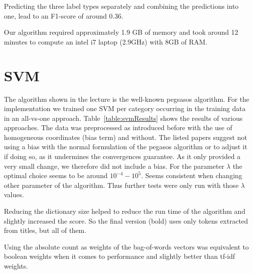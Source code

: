 \documentclass{article}
\begin{document}
    Predicting the three label types separately and combining the predictions into one, lead to an F1-score of around 0.36.

    Our algorithm required approximately 1.9 GB of memory and took around 12 minutes to compute an intel i7 laptop (2.9GHz) with 8GB of RAM.

\section*{SVM}
The algorithm shown in the lecture is the well-known pegsasos algorithm\cite{shalev-shwartz_pegasos:_2011,shalev-shwartz_pegasos:_????}. For the implementation we trained one SVM per category occurring in the training data in an all-vs-one approach.
Table~\ref{table:svmResults} shows the results of various approaches.
The data was preprocessed as introduced before with the use of homogeneous coordinates (bias term) and without. The listed papers suggest not using a bias with the normal formulation of the pegasos algorithm or to adjust it if doing so, as it undermines the convergences guarantee. As it only provided a very small change, we therefore did not include a bias. For the parameter $\lambda$ the optimal choice seems to be around $10^{-4} - 10^{5}$. Seems consistent when changing other parameter of the algorithm. Thus further tests were only run with those $\lambda$ values.

Reducing the dictionary size helped to reduce the run time of the algorithm and slightly increased the score. So the final version (bold) uses only tokens extracted from titles, but all of them.

Using the absolute count as weights of the bag-of-words vectors was equivalent to boolean weights when it comes to performance and slightly better than tf-idf weights.
\end{document}
